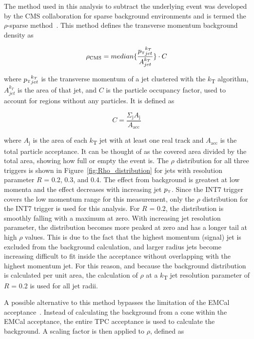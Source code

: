 \documentclass[ALICE]{ALICE_analysis_notes}
\newcommand{\pT}{$p_{\mbox{\tiny T}}$\xspace}
\begin{document}
The method used in this analysis to subtract the underlying event was developed by the CMS collaboration for sparse background environments and is termed the $\rho$-sparse method~\cite{CMS:2012rmf}. This method defines the transverse momentum background density as 

\begin{equation}
    \rho_{\text{CMS}} = median\{\frac{{\text{\pT}}_{jet}^{k_T}}{A_{jet}^{k_T}}\} \cdot C
\end{equation}

\noindent
where ${\text{\pT}}_{jet}^{k_T}$ is the transverse momentum of a jet clustered with the $k$\textsubscript{T} algorithm, $A_{jet}^{k_T}$ is the area of that jet, and $C$ is the particle occupancy factor, used to account for regions without any particles. It is defined as

\begin{equation}
    C = \frac{\Sigma_{\text{j}}A_{\text{j}}}{A_{\text{acc}}}
\end{equation}

\noindent
where $A_\text{j}$ is the area of each $k$\textsubscript{T} jet with at least one real track and $A_{\text{acc}}$ is the total particle acceptance. It can be thought of as the covered area divided by the total area, showing how full or empty the event is. The $\rho$ distribution for all three triggers is shown in Figure~\ref{fig:Rho_distribution} for jets with resolution parameter $R$ = 0.2, 0.3, and 0.4. The effect from background is greatest at low momenta and the effect decreases with increasing jet \pT. Since the INT7 trigger covers the low momentum range for this measurement, only the $\rho$ distribution for the INT7 trigger is used for this analysis. For $R$ = 0.2, the distribution is smoothly falling with a maximum at zero. With increasing jet resolution parameter, the distribution becomes more peaked at zero and has a longer tail at high $\rho$ values. This is due to the fact that the highest momentum (signal) jet is excluded from the background calculation, and larger radius jets become increasing difficult to fit inside the acceptance without overlapping with the highest momentum jet. For this reason, and because the background distribution is calculated per unit area, the calculation of $\rho$ at a $k$\textsubscript{T} jet resolution parameter of $R$ = 0.2 is used for all jet radii.

A possible alternative to this method bypasses the limitation of the EMCal acceptance~\cite{anaNoteMConnors}. Instead of calculating the background from a cone within the EMCal acceptance, the entire TPC acceptance is used to calculate the background. A scaling factor is then applied to $\rho$, defined as 
\end{document}
